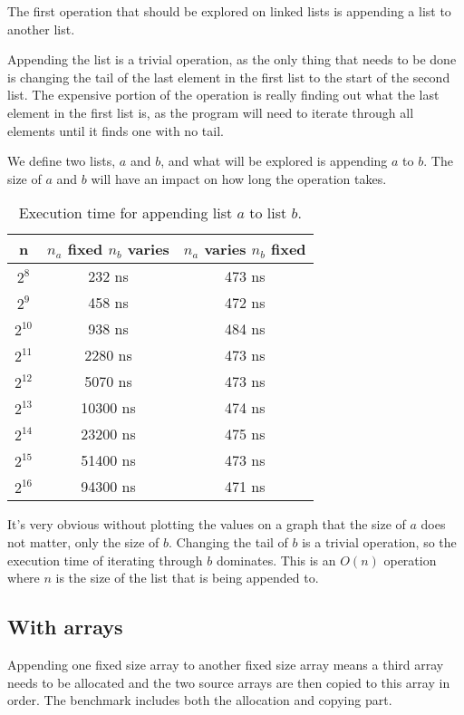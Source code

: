 \documentclass[a4paper,11pt]{article}
\begin{document}
The first operation that should be explored on linked lists is appending a list to another list.

Appending the list is a trivial operation, as the only thing that needs to be done is changing the tail of the last element in the first list to the start of the second list.
The expensive portion of the operation is really finding out what the last element in the first list is, as the program will need to iterate through all elements until it finds one with no tail.

We define two lists, $a$ and $b$, and what will be explored is appending $a$ to $b$. The size of $a$ and $b$ will have an impact on how long the operation takes.

\begin{table}[H]
\centering
\begin{tabular}{|c|c|c|}
\hline
\textbf{n} & \textbf{$n_a$ fixed $n_b$ varies} & \textbf{$n_a$ varies $n_b$ fixed} \\
\hline
	$2^{8}$ & 232 ns & 473 ns \\
	$2^{9}$ & 458 ns & 472 ns \\
	$2^{10}$ & 938 ns & 484 ns \\
	$2^{11}$ & 2280 ns & 473 ns \\
	$2^{12}$ & 5070 ns & 473 ns \\
	$2^{13}$ & 10300 ns & 474 ns \\
	$2^{14}$ & 23200 ns & 475 ns \\
	$2^{15}$ & 51400 ns & 473 ns \\
	$2^{16}$ & 94300 ns & 471 ns \\
\hline
\end{tabular}
\caption{Execution time for appending list $a$ to list $b$.}
\label{tab:table1}
\end{table}

It's very obvious without plotting the values on a graph that the size of $a$ does not matter, only the size of $b$.
Changing the tail of $b$ is a trivial operation, so the execution time of iterating through $b$ dominates. This is an $O(n)$ operation where $n$ is the size of the list that is being appended to.

\subsection*{With arrays}

Appending one fixed size array to another fixed size array means a third array needs to be allocated and the two source arrays are then copied to this array in order. The benchmark includes both the allocation and copying part.
\end{document}
